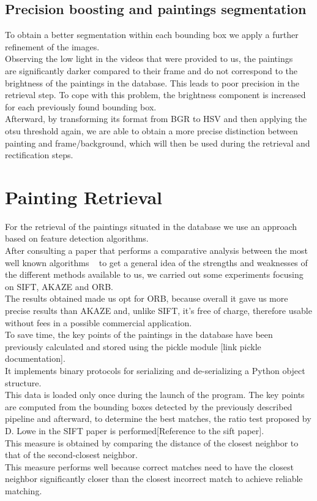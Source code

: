 \documentclass[conference]{IEEEtran}
\begin{document}
\subsection{Precision boosting and paintings segmentation}
To obtain a better segmentation within each bounding box we apply a further refinement of the images.\\
Observing the low light in the videos that were provided to us, the paintings\\
are significantly darker compared to their frame and do not correspond to the brightness of the paintings in the database. This leads to poor precision in the retrieval step. To cope with this problem, the brightness component is increased for each previously found bounding box.\\
Afterward, by transforming its format from BGR to HSV and then applying the otsu threshold again, we are able to obtain a more precise distinction between painting and frame/background, which will then be used during the retrieval and rectification steps.


\section{Painting Retrieval}
For the retrieval of the paintings situated in the database we use an approach based on feature detection algorithms.\\ 
After consulting a paper that performs a comparative analysis between the most well known algorithms ~\cite{b1} to get a general idea of the strengths and weaknesses of the different methods available to us, we carried out some experiments focusing on SIFT, AKAZE and ORB.\\
The results obtained made us opt for ORB, because overall it gave us more precise results than AKAZE and, unlike SIFT, it’s free of charge, therefore usable without fees in a possible commercial application.\\
To save time, the key points of the paintings in the database have been previously calculated and stored using the pickle module [link pickle documentation].\\
It implements binary protocols for serializing and de-serializing a Python object structure.\\
This data is loaded only once during the launch of the program.
The key points are computed from the bounding boxes detected by the previously described pipeline and afterward, to determine the best matches, the ratio test proposed by D. Lowe in the SIFT paper is performed[Reference to the sift paper].\\
This measure is obtained by comparing the distance of the closest neighbor to that of the second-closest neighbor.\\
This measure performs well because correct matches need to have the closest neighbor significantly closer than the closest incorrect match to achieve reliable matching.\\
\end{document}
